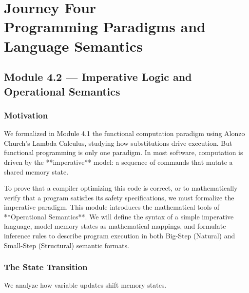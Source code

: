 \documentclass[12pt, a4paper]{book}
\begin{document}
\setcounter{chapter}{3}
\chapter[Journey 4 --- Programming Paradigms and Language Semantics]
        {Journey Four\\[8pt]
         \textcolor{ModuleColor}{\large Programming Paradigms and Language Semantics}}
\setcounter{section}{1}

\section{Module 4.2 --- Imperative Logic and Operational Semantics}
\label{sec:mod4.2}

\subsection*{Motivation}

We formalized in Module 4.1 the functional computation paradigm using Alonzo Church's Lambda Calculus, studying how substitutions drive execution.
But functional programming is only one paradigm.
In most software, computation is driven by the **imperative** model: a sequence of commands that mutate a shared memory state.

To prove that a compiler optimizing this code is correct, or to mathematically verify that a program satisfies its safety specifications, we must formalize the imperative paradigm.
This module introduces the mathematical tools of **Operational Semantics**.
We will define the syntax of a simple imperative language, model memory states as mathematical mappings, and formulate inference rules to describe program execution in both Big-Step (Natural) and Small-Step (Structural) semantic formats.

\subsection{The State Transition}

We analyze how variable updates shift memory states.
\end{document}
